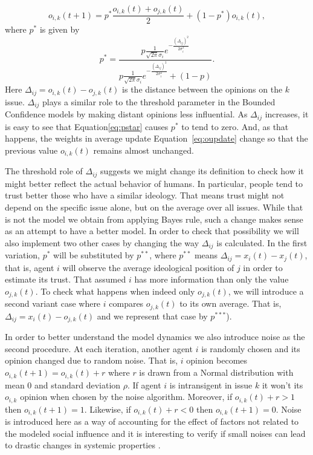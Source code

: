 \documentclass{article}
\begin{document}
  \begin{equation}\label{eq:oupdate}
    o_{i,k}(t+1) =
    p^{*}
    \frac{o_{i,k}(t) + o_{j,k}(t) }{2}
    +
    (1 - p^{*})
    o_{i,k}(t),
  \end{equation}
where  $p^{*}$ is given by
  \begin{equation}\label{eq:pstar}
   p^{*}
    =
  \frac{
      p \frac{1}{\sqrt{2 \pi} \sigma_i}
      e^{- \frac{ (\Delta_{ij})^2}{2 \sigma_i^2}}
    }{
      p
      \frac{1}{\sqrt{2 \pi} \sigma_i}
    e^{- \frac{ ( \Delta_{ij})^2}{2 \sigma_i^2}}
    +
    (1 - p)
  }.
  \end{equation}
Here \(\Delta_{ij} = o_{i,k} (t) - o_{j,k} (t)\) is the distance between the opinions on the $k$ issue. $\Delta_{ij}$ plays a
similar role to the threshold parameter in the Bounded Confidence models by making distant opinions less influential. As $\Delta_{ij}$ increases, it is easy to see that Equation\ref{eq:pstar} causes  $p^{*}$ to tend to zero. And, as that happens, the weights in average update Equation~\ref{eq:oupdate} change so that the previous value $ o_{i,k}(t)$ remains almost unchanged.

The threshold role of $\Delta_{ij}$ suggests we might change its definition to check how it might better reflect the actual behavior of humans. In particular, people tend to trust better those who have a similar ideology. That means trust might not depend on the specific issue alone, but on the average over all issues. While that is not the model we obtain from applying Bayes rule, such a change makes sense
as an attempt to have a better model. In order to check that possibility we will also implement two other cases by changing the way $\Delta_{ij}$ is calculated. In the first variation, $p^*$ will be substituted by \(p^{**}\), where \(p^{**}\) means 
 \(\Delta_{ij} = x_i(t) - x_j(t) \), that is, agent $i$ will observe the average ideological position of $j$ in order to estimate its trust. That assumed $i$ has more information than only the value $o_{j,k}(t)$. To check what happens when indeed only $o_{j,k}(t)$, we will introduce a second variant case where $i$ compares $o_{j,k}(t)$ to its own average. That is,  \(\Delta_{ij} = x_{i}(t) - o_{j,k}(t)\) and we represent that case by \(p^{***}\)).

In order to better understand the model dynamics we also introduce noise as the second procedure. At each iteration, 
another agent \(i\) is randomly chosen and its opinion changed due to random noise. That is, $i$ opinion becomes \(
o_{i,k}(t+1) = o_{i,k}(t) + r \) where \(r\) is drawn from a Normal
distribution with mean 0 and standard deviation \(\rho\). If agent \(i\) is intransigent in
issue \(k\) it won't its \(o_{i,k}\) opinion when chosen by
the noise algorithm. Moreover, if \(o_{i,k}(t) + r > 1\) then \( o_{i,k}(t+1) =
1\). Likewise, if \(o_{i,k}(t) + r < 0 \) then \( o_{i,k}(t+1) = 0\). Noise
is introduced here as a way of accounting for the effect of factors not related to the modeled
social influence \cite{flache2017} and it is interesting to verify if small noises can lead to drastic changes in
systemic properties \cite{macy2015signal}.
\end{document}
